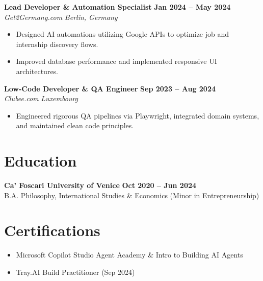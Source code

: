 \documentclass[10pt,a4paper]{article}
\begin{document}
\textbf{Lead Developer \& Automation Specialist} \hfill \textbf{Jan 2024 -- May 2024} \\
\textit{Get2Germany.com} \hfill \textit{Berlin, Germany}
\begin{itemize}[leftmargin=*,noitemsep]
    \item Designed AI automations utilizing Google APIs to optimize job and internship discovery flows.
    \item Improved database performance and implemented responsive UI architectures.
\end{itemize}

\textbf{Low-Code Developer \& QA Engineer} \hfill \textbf{Sep 2023 -- Aug 2024} \\
\textit{Clubee.com} \hfill \textit{Luxembourg}
\begin{itemize}[leftmargin=*,noitemsep]
    \item Engineered rigorous QA pipelines via Playwright, integrated domain systems, and maintained clean code principles.
\end{itemize}

\section{Education}
\textbf{Ca' Foscari University of Venice} \hfill \textbf{Oct 2020 -- Jun 2024} \\
B.A. Philosophy, International Studies \& Economics (Minor in Entrepreneurship)

\section{Certifications}
\begin{itemize}[leftmargin=*,noitemsep]
    \item Microsoft Copilot Studio Agent Academy \& Intro to Building AI Agents
    \item Tray.AI Build Practitioner (Sep 2024)
\end{itemize}
\end{document}
